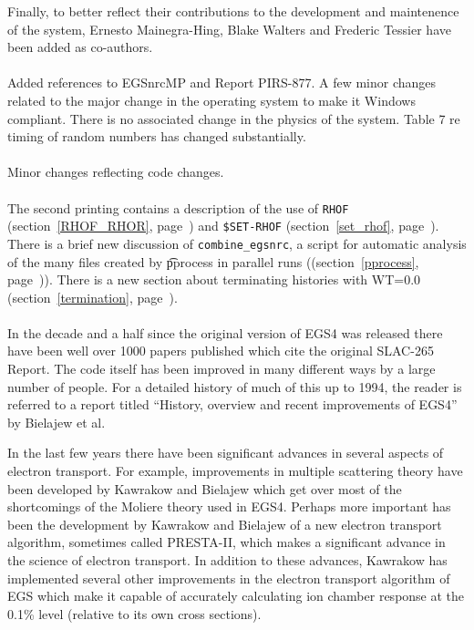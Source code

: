 Finally, to better reflect their contributions 
to the development and maintenence of the system, Ernesto Mainegra-Hing, 
Blake Walters and Frederic Tessier have been added as co-authors. 
\vspace{3mm}\\
\\
Added references to EGSnrcMP and Report PIRS-877. A few minor changes
related to the major change in the operating system to make it Windows
compliant. There is no associated change in the physics of the system.
Table 7 re timing of random numbers has changed substantially.
\vspace{3mm}\\
\\
Minor changes reflecting code changes. 
\vspace{3mm}\\
\\
The second printing contains a description of the use of {\tt RHOF}
(section~\ref{RHOF_RHOR}, page~\pageref{RHOF_RHOR}) and {\tt \$SET-RHOF}
(section~\ref{set_rhof}, page~\pageref{set_rhof}). There is a brief new
discussion of {\tt combine\_egsnrc}, a script for automatic analysis of the
many files created by {\t pprocess} in parallel runs
((section~\ref{pprocess}, page~\pageref{pprocess})). There is a new section
about terminating histories with WT=0.0 (section~\ref{termination},
page~\pageref{termination}). 
\vspace{3mm}\\
\\
In the decade and a half since the original version of EGS4 was released
there have been well over 1000 papers published which cite the original
SLAC-265 Report.  The code itself has been improved in many different ways
by a large number of people.  For a detailed history of much of this up to
1994, the reader is referred to a report titled  ``History, overview and
recent improvements of EGS4'' by Bielajew et al.

In the last few years there have been significant advances in several
aspects of electron transport.  For example, improvements in multiple scattering
theory have been developed by Kawrakow and Bielajew\cite{KB97,Bi96,Ka96} 
which get over most of
the shortcomings of the Moliere theory used in EGS4. Perhaps more important
has been the development by Kawrakow and Bielajew\cite{KB97a} of a new electron transport algorithm, sometimes
called PRESTA-II, which makes a significant advance in the science of
electron transport.  In addition to these advances, Kawrakow has implemented
several other improvements in the electron transport algorithm of EGS
which make it capable of accurately calculating ion chamber response at the
0.1\% level (relative to its own cross sections)\cite{Ka99a,Ka99b}.  

